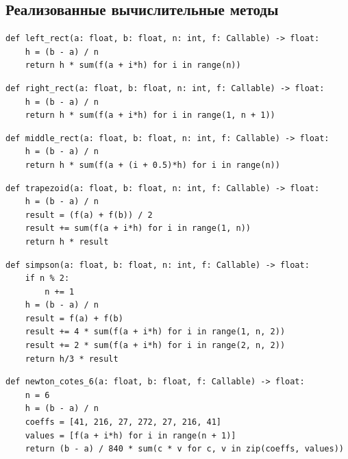 \documentclass[a4paper,12pt]{article}
\begin{document}
\subsection{Реализованные вычислительные методы}



\begin{lstlisting}[style=intellij,caption={Левые прямоугольники}]
def left_rect(a: float, b: float, n: int, f: Callable) -> float:
    h = (b - a) / n
    return h * sum(f(a + i*h) for i in range(n))
\end{lstlisting}



\begin{lstlisting}[style=intellij,caption={Правые прямоугольники}]
def right_rect(a: float, b: float, n: int, f: Callable) -> float:
    h = (b - a) / n
    return h * sum(f(a + i*h) for i in range(1, n + 1))
\end{lstlisting}



\begin{lstlisting}[style=intellij,caption={Средние прямоугольники}]
def middle_rect(a: float, b: float, n: int, f: Callable) -> float:
    h = (b - a) / n
    return h * sum(f(a + (i + 0.5)*h) for i in range(n))
\end{lstlisting}



\begin{lstlisting}[style=intellij,caption={Метод трапеций}]
def trapezoid(a: float, b: float, n: int, f: Callable) -> float:
    h = (b - a) / n
    result = (f(a) + f(b)) / 2
    result += sum(f(a + i*h) for i in range(1, n))
    return h * result
\end{lstlisting}



\begin{lstlisting}[style=intellij,caption={Метод Симпсона}]
def simpson(a: float, b: float, n: int, f: Callable) -> float:
    if n % 2:
        n += 1
    h = (b - a) / n
    result = f(a) + f(b)
    result += 4 * sum(f(a + i*h) for i in range(1, n, 2))
    result += 2 * sum(f(a + i*h) for i in range(2, n, 2))
    return h/3 * result
\end{lstlisting}



\begin{lstlisting}[style=intellij,caption={Ньютона-Котеса n=6}]
def newton_cotes_6(a: float, b: float, f: Callable) -> float:
    n = 6
    h = (b - a) / n
    coeffs = [41, 216, 27, 272, 27, 216, 41]
    values = [f(a + i*h) for i in range(n + 1)]
    return (b - a) / 840 * sum(c * v for c, v in zip(coeffs, values))
\end{lstlisting}
\end{document}
